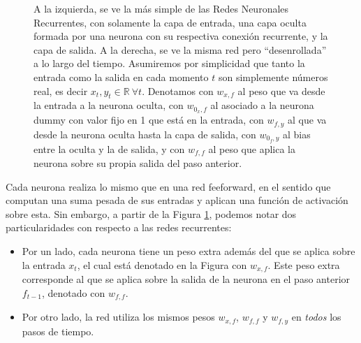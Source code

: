\documentclass[../../main.tex]{subfiles}
\begin{document}
\begin{figure}[h]
    \caption{A la izquierda, se ve la más simple de las Redes Neuronales Recurrentes, con
    solamente la capa de entrada, una capa oculta formada por una neurona con su
    respectiva conexión recurrente, y la capa de salida. A la derecha, se ve la misma red
    pero ``desenrollada'' a lo largo del tiempo. Asumiremos por simplicidad que tanto la
    entrada como la salida en cada momento \(t\) son simplemente números real, es decir
    \(x_t, y_t \in \mathbb{R} \ \forall t\). Denotamos con \(w_{x,f}\) al peso que va
    desde la entrada a la neurona oculta, con \(w_{0_x,f}\) al asociado a la neurona dummy
    con valor fijo en 1 que está en la entrada, con \(w_{f,y}\) al que va desde la neurona
    oculta hasta la capa de salida, con \(w_{0_f, y}\) al bias entre la oculta y la de
    salida, y con \(w_{f,f}\) al peso que aplica la neurona sobre su propia salida del paso
    anterior.}
    \label{fig:simple-rnn}
\end{figure}

Cada neurona realiza lo mismo que en una red feeforward, en el sentido que computan una
suma pesada de sus entradas y aplican una función de activación sobre esta. Sin embargo, a
partir de la Figura \ref{fig:simple-rnn}, podemos notar dos particularidades con respecto
a las redes recurrentes: \vspace{-0.25cm}
\begin{itemize}[itemsep=0.1cm]
    \item Por un lado, cada neurona tiene un peso extra además del que se aplica sobre la
    entrada \(x_t\), el cual está denotado en la Figura con \(w_{x,f}\). Este peso extra
    corresponde al que se aplica sobre la salida de la neurona en el paso anterior
    \(f_{t-1}\), denotado con \(w_{f,f}\).
    \item Por otro lado, la red utiliza los mismos pesos \(w_{x,f}\), \(w_{f,f}\) y
    \(w_{f,y}\) en \textit{todos} los pasos de tiempo.
\end{itemize}
\end{document}
